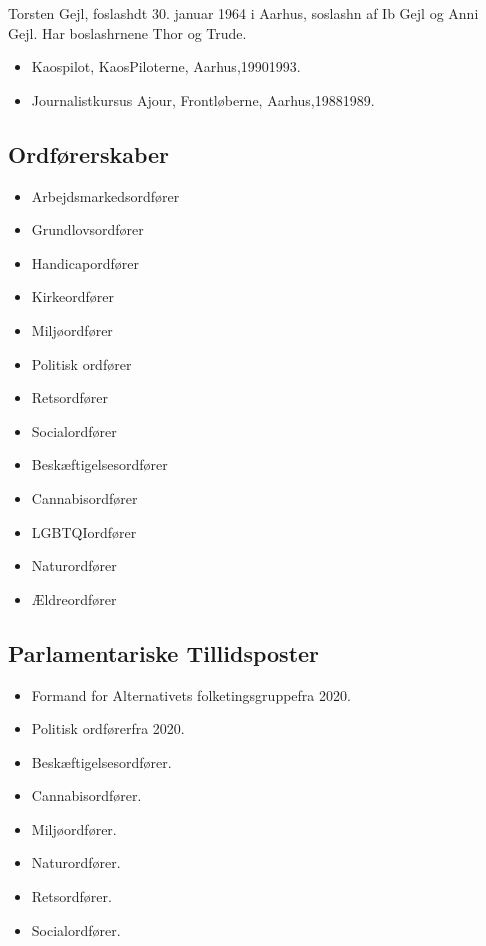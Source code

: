 \documentclass[11pt, a4paper]{awesome-cv}
\begin{document}
\makecvheader[R]
\makelettertitle
\begin{cvletter}
Torsten Gejl, foslashdt 30. januar 1964 i Aarhus, soslashn af Ib Gejl og Anni Gejl. Har boslashrnene Thor og Trude.

\begin{itemize}
\item Kaospilot, KaosPiloterne, Aarhus,19901993.
\item Journalistkursus Ajour, Frontløberne, Aarhus,19881989.
\end{itemize}
\subsection*{Ordførerskaber}
\begin{itemize}
\item Arbejdsmarkedsordfører
\item Grundlovsordfører
\item Handicapordfører
\item Kirkeordfører
\item Miljøordfører
\item Politisk ordfører
\item Retsordfører
\item Socialordfører
\item Beskæftigelsesordfører
\item Cannabisordfører
\item LGBTQIordfører
\item Naturordfører
\item Ældreordfører
\end{itemize}
\subsection*{Parlamentariske Tillidsposter}
\begin{itemize}
\item Formand for Alternativets folketingsgruppefra 2020.
\item Politisk ordførerfra 2020.
\item Beskæftigelsesordfører.
\item Cannabisordfører.
\item Miljøordfører.
\item Naturordfører.
\item Retsordfører.
\item Socialordfører.
\end{itemize}

\end{cvletter}
\end{document}
